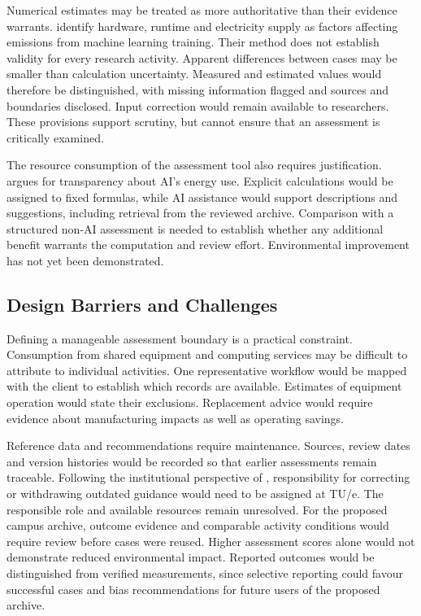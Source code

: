 \documentclass[11pt,a4paper]{article}
\begin{document}
Numerical estimates may be treated as more authoritative than their evidence warrants. \citet{lacoste2019carbon} identify hardware, runtime and electricity supply as factors affecting emissions from machine learning training. Their method does not establish validity for every research activity. Apparent differences between cases may be smaller than calculation uncertainty. Measured and estimated values would therefore be distinguished, with missing information flagged and sources and boundaries disclosed. Input correction would remain available to researchers. These provisions support scrutiny, but cannot ensure that an assessment is critically examined.

The resource consumption of the assessment tool also requires justification. \citet{lin2023cost} argues for transparency about AI's energy use. Explicit calculations would be assigned to fixed formulas, while AI assistance would support descriptions and suggestions, including retrieval from the reviewed archive. Comparison with a structured non-AI assessment is needed to establish whether any additional benefit warrants the computation and review effort. Environmental improvement has not yet been demonstrated.

\subsection{Design Barriers and Challenges}

Defining a manageable assessment boundary is a practical constraint. Consumption from shared equipment and computing services may be difficult to attribute to individual activities. One representative workflow would be mapped with the client to establish which records are available. Estimates of equipment operation would state their exclusions. Replacement advice would require evidence about manufacturing impacts as well as operating savings.

Reference data and recommendations require maintenance. Sources, review dates and version histories would be recorded so that earlier assessments remain traceable. Following the institutional perspective of \citet{hasselbalch2025sustainability}, responsibility for correcting or withdrawing outdated guidance would need to be assigned at TU/e. The responsible role and available resources remain unresolved. For the proposed campus archive, outcome evidence and comparable activity conditions would require review before cases were reused. Higher assessment scores alone would not demonstrate reduced environmental impact. Reported outcomes would be distinguished from verified measurements, since selective reporting could favour successful cases and bias recommendations for future users of the proposed archive.
\end{document}
